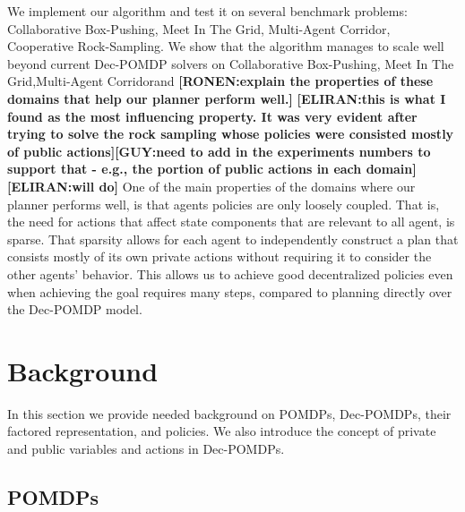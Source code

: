 \documentclass[letterpaper]{article} %
\newcommand{\eliran}[1]{\textbf{[\color{red}ELIRAN:#1]}}
\newcommand{\ronen}[1]{\textbf{[\color{blue}RONEN:#1]}}
\newcommand{\guy}[1]{\textbf{[\color{orange}GUY:#1]}}
\newcommand{\cbp}[0]{Collaborative Box-Pushing}
\newcommand{\mitg}[0]{Meet In The Grid}
\newcommand{\crs}[0]{Cooperative Rock-Sampling}
\newcommand{\macor}[0]{Multi-Agent Corridor}
\begin{document}
We implement our algorithm and test it on several benchmark problems: \cbp, \mitg, \macor, \crs. We show that the algorithm manages to scale well beyond
current Dec-POMDP solvers on \cbp, \mitg ,\macor and \ronen{explain the properties of these domains that help our planner perform well.} \eliran{this is what I found as the most influencing property. It was very evident after trying to solve the rock sampling whose policies were consisted mostly of public actions}\guy{need to add in the experiments numbers to support that - e.g., the portion of public actions in each domain}\eliran{will do}
One of the main properties of the domains where our planner performs well, is that agents policies are only loosely coupled. That is, the need for actions that affect state components that are relevant to all agent, is sparse. That sparsity allows for each agent to independently construct a plan that consists mostly of its own private actions without requiring it to consider the other agents' behavior. This allows us to achieve good decentralized policies even when achieving the goal requires many steps, compared to planning directly over the Dec-POMDP model.



\section{Background}

In this section we provide needed background on POMDPs, Dec-POMDPs, their factored representation,
and policies. We also introduce the concept of private and public variables and actions in Dec-POMDPs.

\subsection{POMDPs}
\end{document}
